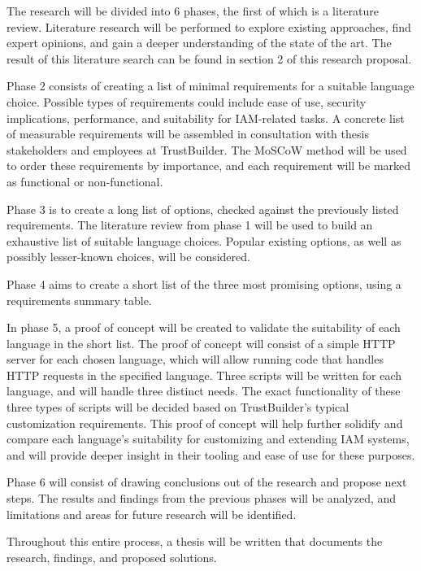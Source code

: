 The research will be divided into 6 phases, the first of which is a literature review. Literature research will be performed to explore existing approaches, find expert opinions, and gain a deeper understanding of the state of the art. The result of this literature search can be found in section 2 of this research proposal.

Phase 2 consists of creating a list of minimal requirements for a suitable language choice. Possible types of requirements could include ease of use, security implications, performance, and suitability for IAM-related tasks. A concrete list of measurable requirements will be assembled in consultation with thesis stakeholders and employees at TrustBuilder. The MoSCoW method will be used to order these requirements by importance, and each requirement will be marked as functional or non-functional.

Phase 3 is to create a long list of options, checked against the previously listed requirements. The literature review from phase 1 will be used to build an exhaustive list of suitable language choices. Popular existing options, as well as possibly lesser-known choices, will be considered.

Phase 4 aims to create a short list of the three most promising options, using a requirements summary table.

In phase 5, a proof of concept will be created to validate the suitability of each language in the short list. The proof of concept will consist of a simple HTTP server for each chosen language, which will allow running code that handles HTTP requests in the specified language. Three scripts will be written for each language, and will handle three distinct needs. The exact functionality of these three types of scripts will be decided based on TrustBuilder's typical customization requirements. This proof of concept will help further solidify and compare each language's suitability for customizing and extending IAM systems, and will provide deeper insight in their tooling and ease of use for these purposes.

Phase 6 will consist of drawing conclusions out of the research and propose next steps. The results and findings from the previous phases will be analyzed, and limitations and areas for future research will be identified.

Throughout this entire process, a thesis will be written that documents the research, findings, and proposed solutions.


